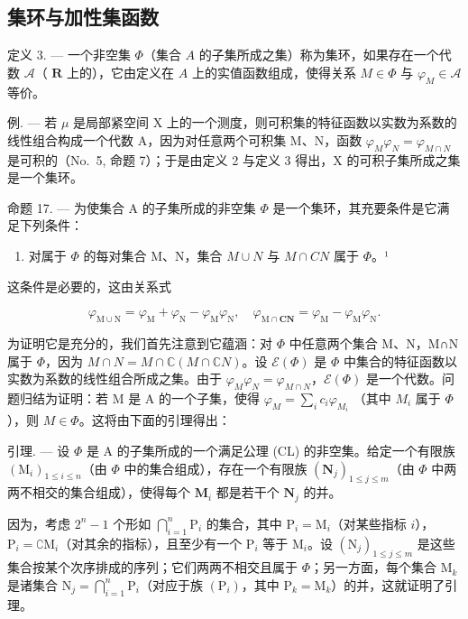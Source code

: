 \subsection{集环与加性集函数}

定义 3. --- 一个非空集 \(\Phi\)（集合 \(A\) 的子集所成之集）称为集环，如果存在一个代数 \(\mathcal{A}\)（ \(\mathbf{R}\) 上的），它由定义在 \(A\) 上的实值函数组成，使得关系 \(M \in \Phi\) 与 \(\varphi_{M} \in \mathcal{A}\) 等价。

例. --- 若 \(\mu\) 是局部紧空间 X 上的一个测度，则可积集的特征函数以实数为系数的线性组合构成一个代数 A，因为对任意两个可积集 M、N，函数 \(\varphi_{M}\varphi_{N} = \varphi_{M\cap N}\) 是可积的（No.~5, 命题 7）；于是由定义 2 与定义 3 得出，X 的可积子集所成之集是一个集环。

命题 17. --- 为使集合 A 的子集所成的非空集 \(\Phi\) 是一个集环，其充要条件是它满足下列条件：

\begin{enumerate}
\def\labelenumi{(\Roman{enumi})}
\setcounter{enumi}{149}
\tightlist
\item
  对属于 \(\Phi\) 的每对集合 M、N，集合 \(M\cup N\) 与 \(M\cap CN\) 属于 \(\Phi\)。¹
\end{enumerate}

这条件是必要的，这由关系式

\[
\varphi_ {\mathrm{M} \cup \mathrm{N}} = \varphi_ {\mathrm{M}} + \varphi_ {\mathrm{N}} - \varphi_ {\mathrm{M}} \varphi_ {\mathrm{N}}, \quad \varphi_ {\mathrm{M} \cap \mathbf {C N}} = \varphi_ {\mathrm{M}} - \varphi_ {\mathrm{M}} \varphi_ {\mathrm{N}}.
\]

为证明它是充分的，我们首先注意到它蕴涵：对 \(\Phi\) 中任意两个集合 M、N，M∩N 属于 \(\Phi\)，因为 \(M\cap N=M\cap\mathbb{C}(M\cap\mathbb{C}N)\)。设 \(\mathcal{E}(\Phi)\) 是 \(\Phi\) 中集合的特征函数以实数为系数的线性组合所成之集。由于 \(\varphi_{M}\varphi_{N}=\varphi_{M\cap N}\)，\(\mathcal{E}(\Phi)\) 是一个代数。问题归结为证明：若 M 是 A 的一个子集，使得 \(\varphi_{M}=\sum_{i}c_{i}\varphi_{M_{i}}\) （其中 \(M_{i}\) 属于 \(\Phi\)），则 \(M\in\Phi\)。这将由下面的引理得出：

引理. --- 设 \(\Phi\) 是 A 的子集所成的一个满足公理 (CL) 的非空集。给定一个有限族 \((\mathrm{M}_i)_{1 \leqslant i \leqslant n}\)（由 \(\Phi\) 中的集合组成），存在一个有限族 \((\mathbf{N}_j)_{1\leqslant j\leqslant m}\)（由 \(\Phi\) 中两两不相交的集合组成），使得每个 \(\mathbf{M}_i\) 都是若干个 \(\mathbf{N}_j\) 的并。

因为，考虑 \(2^{n} - 1\) 个形如 \(\bigcap_{i=1}^{n} \mathrm{P}_{i}\) 的集合，其中 \(\mathrm{P}_{i} = \mathrm{M}_{i}\)（对某些指标 \(i\)），\(\mathrm{P}_{i} = \complement \mathrm{M}_{i}\)（对其余的指标），且至少有一个 \(\mathrm{P}_{i}\) 等于 \(\mathrm{M}_{i}\)。设 \((\mathrm{N}_{j})_{1 \leqslant j \leqslant m}\) 是这些集合按某个次序排成的序列；它们两两不相交且属于 \(\Phi\)；另一方面，每个集合 \(\mathrm{M}_{k}\) 是诸集合 \(\mathrm{N}_{j} = \bigcap_{i=1}^{n} \mathrm{P}_{i}\)（对应于族 \((\mathrm{P}_{i})\)，其中 \(\mathrm{P}_{k} = \mathrm{M}_{k}\)）的并，这就证明了引理。

